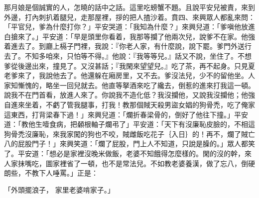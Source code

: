 \begin{showcontents}{}
那月娘是個誠實的人，怎曉的話中之話。這里吃螃蟹不題。且說平安兒被責，來到外邊，打內刺扒着腿兒，走那屋裡，拶的把人揸沙着。賁四、來興眾人都亂來問：「平官兒，爹為什麼打你？」平安哭道：「我知為什麼？」來興兒道：「爹嗔他放進白搶來了。」平安道：「早是頭里你看着，我那等攔了他兩次兒，說爹不在家。他強着進去了。到廳上槅子門裡，我說：『你老人家，有什麼說，說下罷。爹門外送行去了。不知多咱來，只怕等不得。』他說：『我等等兒。』話又不說，坐住了。不想爹從後邊出來，撞見了。又沒甚話；『我閑來望望兒。』吃了茶，再不起身。只見夏老爹來了，我說他去了。他還躲在廂房里，又不去。爹沒法兒，少不的留他坐。人家知慚愧的，略坐一回兒就去。他直等拏酒來吃了纔去，倒惹的進來打我這一頓。說我不在門首看，放進人來了。你說我不造化低？我沒攔他，又說我沒攔他；他強自進來坐着，不虧了管我腿事，打我！教那個賊天殺男盜女娼的狗骨禿，吃了俺家這東西，打背梁春下過！」來興兒道：「爛折春梁骨的，倒好了他往下撞。」平安道：「教他生噎食病，把顙根軸子爛弔了」平安道：「天下有沒廉恥皮臉的，不相這狗骨禿沒廉恥，來我家闖的狗也不咬，賊雌飯吃花子｛入日｝的！再不，爛了賊亡八的屁股門子！」來興笑道：「爛了屁股，門上人不知道，只說是臊的。」眾人都笑了。平安道：「想必是家裡沒晚米做飯，老婆不知餓得怎麼樣的。閑的沒的幹，來人家抹嘴吃，圖家裡省了一頓，也不是常法兒。不如教老婆養漢，做了忘八，倒硬朗些，不教下人唾罵。」正是：

「外頭擺浪子，  家里老婆啃家子。」


\end{showcontents}
